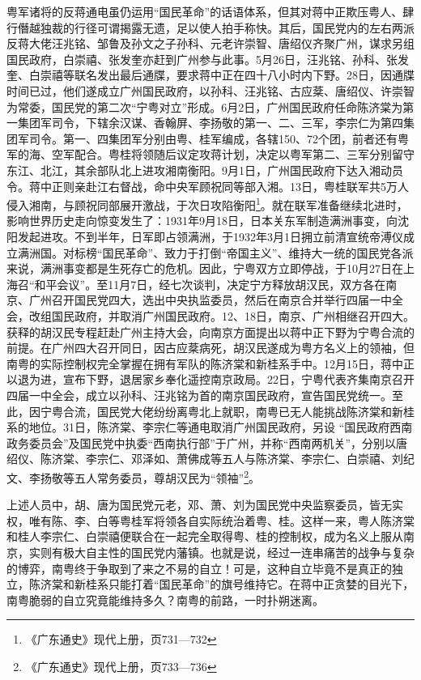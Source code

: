 粤军诸将的反蒋通电虽仍运用“国民革命”的话语体系，但其对蒋中正欺压粤人、肆行僭越独裁的行径可谓揭露无遗，足以使人拍手称快。其后，国民党内的左右两派反蒋大佬汪兆铭、邹鲁及孙文之子孙科、元老许崇智、唐绍仪齐聚广州，谋求另组国民政府，白崇禧、张发奎亦赶到广州参与此事。5月26日，汪兆铭、孙科、张发奎、白崇禧等联名发出最后通牒，要求蒋中正在四十八小时内下野。28日，因通牒时间已过，他们遂成立广州国民政府，以孙科、汪兆铭、古应棻、唐绍仪、许崇智为常委，国民党的第二次“宁粤对立”形成。6月2日，广州国民政府任命陈济棠为第一集团军司令，下辖余汉谋、香翰屏、李扬敬的第一、二、三军，李宗仁为第四集团军司令。第一、四集团军分别由粤、桂军编成，各辖150、72个团，前者还有粤军的海、空军配合。粤桂将领随后议定攻蒋计划，决定以粤军第二、三军分别留守东江、北江，其余部队北上进攻湘南衡阳。9月1日，广州国民政府下达入湘动员令。蒋中正则亲赴江右督战，命中央军顾祝同等部入湘。13日，粤桂联军共5万人侵入湘南，与顾祝同部展开激战，于次日攻陷衡阳\footnote{《广东通史》现代上册，页731—732}。就在联军准备继续北进时，影响世界历史走向惊变发生了：1931年9月18日，日本关东军制造满洲事变，向沈阳发起进攻。不到半年，日军即占领满洲，于1932年3月1日拥立前清宣统帝溥仪成立满洲国。对标榜“国民革命”、致力于打倒“帝国主义”、维持大一统的国民党各派来说，满洲事变都是生死存亡的危机。因此，宁粤双方立即停战，于10月27日在上海召“和平会议”。至11月7日，经七次谈判，决定宁方释放胡汉民，双方各在南京、广州召开国民党四大，选出中央执监委员，然后在南京合并举行四届一中全会，改组国民政府，并取消广州国民政府。12、18日，南京、广州相继召开四大。获释的胡汉民专程赶赴广州主持大会，向南京方面提出以蒋中正下野为宁粤合流的前提。在广州四大召开同日，因古应棻病死，胡汉民遂成为粤方名义上的领袖，但南粤的实际控制权完全掌握在拥有军队的陈济棠和新桂系手中。12月15日，蒋中正以退为进，宣布下野，退居家乡奉化遥控南京政局。22日，宁粤代表齐集南京召开四届一中全会，成立以孙科、汪兆铭为首的南京国民政府，宣告国民党统一。至此，因宁粤合流，国民党大佬纷纷离粤北上就职，南粤已无人能挑战陈济棠和新桂系的地位。31日，陈济棠、李宗仁等通电取消广州国民政府，另设 “国民政府西南政务委员会”及国民党中执委“西南执行部”于广州，并称“西南两机关”，分别以唐绍仪、陈济棠、李宗仁、邓泽如、萧佛成等五人与陈济棠、李宗仁、白崇禧、刘纪文、李扬敬等五人常务委员，尊胡汉民为“领袖”\footnote{《广东通史》现代上册，页733—736}。

上述人员中，胡、唐为国民党元老，邓、萧、刘为国民党中央监察委员，皆无实权，唯有陈、李、白等粤桂军将领各自实际统治着粤、桂。这样一来，粤人陈济棠和桂人李宗仁、白崇禧便联合在一起完全取得粤、桂的控制权，成为名义上服从南京，实则有极大自主性的国民党内藩镇。也就是说，经过一连串痛苦的战争与复杂的博弈，南粤终于争取到了来之不易的自立！可是，这种自立毕竟不是真正的独立，陈济棠和新桂系只能打着“国民革命”的旗号维持它。在蒋中正贪婪的目光下，南粤脆弱的自立究竟能维持多久？南粤的前路，一时扑朔迷离。


